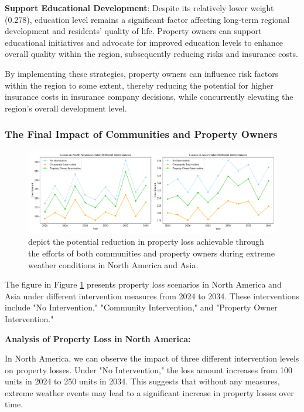 \documentclass[12pt]{article}
\begin{document}
\textbf{Support Educational Development}: Despite its relatively lower weight (0.278), education level remains a significant factor affecting long-term regional development and residents' quality of life. Property owners can support educational initiatives and advocate for improved education levels to enhance overall quality within the region, subsequently reducing risks and insurance costs.

By implementing these strategies, property owners can influence risk factors within the region to some extent, thereby reducing the potential for higher insurance costs in insurance company decisions, while concurrently elevating the region's overall development level.


\subsubsection{The Final Impact of Communities and Property Owners}
\begin{figure}[htbp]
    \centering
    \includegraphics[width=0.9\linewidth]{figure/loss.pdf}
    \caption{depict the potential reduction in property loss achievable through the efforts of both communities and property owners during extreme weather conditions in North America and Asia.}
    \label{total}
\end{figure}

The figure in Figure \ref{total} presents property loss scenarios in North America and Asia under different intervention measures from 2024 to 2034. These interventions include "No Intervention," "Community Intervention," and "Property Owner Intervention."

\textbf{Analysis of Property Loss in North America:}

In North America, we can observe the impact of three different intervention levels on property losses. Under "No Intervention," the loss amount increases from 100 units in 2024 to 250 units in 2034. This suggests that without any measures, extreme weather events may lead to a significant increase in property losses over time.
\end{document}
